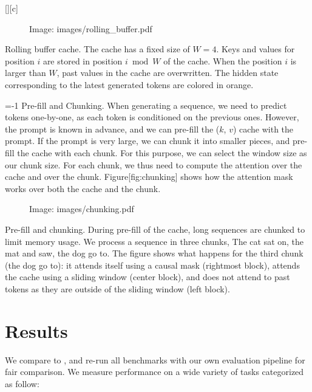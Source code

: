 \documentclass[11pt,a4paper]{article}
\begin{document}
[][c]

\begin{figure}[h]
\caption{Image: images/rolling\_buffer.pdf}
\end{figure}

Rolling buffer cache. The cache has a fixed size of $W=4$. Keys and values for position $i$ are stored in position $i \bmod W$ of the cache. When the position $i$ is larger than $W$, past values in the cache are overwritten.
The hidden state corresponding to the latest generated tokens are colored in orange.

=-1 Pre-fill and Chunking. When generating a sequence, we need to predict tokens one-by-one, as each token is conditioned on the previous ones. However, the prompt is known in advance, and we can pre-fill the ($k$, $v$) cache with the prompt. If the prompt is very large, we can chunk it into smaller pieces, and pre-fill the cache with each chunk. For this purpose, we can select the window size as our chunk size. 
For each chunk, we thus need to compute the attention over the cache and over the chunk. 
Figure[fig:chunking] shows how the attention mask works over both the cache and the chunk.

\begin{figure}[h]
\caption{Image: images/chunking.pdf}
\end{figure}

Pre-fill and chunking.
During pre-fill of the cache, long sequences are chunked to limit memory usage.
We process a sequence in three chunks, The cat sat on, the mat and saw, the dog go to. 
The figure shows what happens for the third chunk (the dog go to): it attends itself using a causal mask (rightmost block), attends the cache using a sliding window (center block), and does not attend to past tokens as they are outside of the sliding window (left block).

\section{Results}

We compare to , and re-run all benchmarks with our own evaluation pipeline for fair comparison.
We measure performance on a wide variety of tasks categorized as follow:
\end{document}
